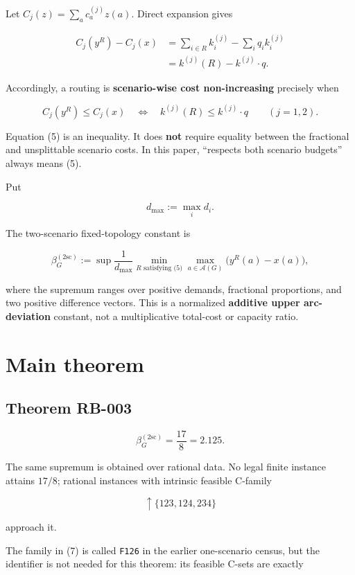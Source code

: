\documentclass[
  11pt,
]{article}
\begin{document}
Let \(C_j(z)=\sum_a c_a^{(j)}z(a)\). Direct expansion gives

\[
\begin{aligned}
C_j(y^R)-C_j(x)
&=\sum_{i\in R}k_i^{(j)}-\sum_iq_i k_i^{(j)}\\
&=k^{(j)}(R)-k^{(j)}\!\cdot q.
\end{aligned}
\tag{4}
\]

Accordingly, a routing is \textbf{scenario-wise cost non-increasing}
precisely when

\[
C_j(y^R)\le C_j(x)
\quad\Longleftrightarrow\quad
k^{(j)}(R)\le k^{(j)}\!\cdot q
\qquad(j=1,2).
\tag{5}
\]

Equation (5) is an inequality. It does \textbf{not} require equality
between the fractional and unsplittable scenario costs. In this paper,
``respects both scenario budgets'' always means (5).

Put

\[
d_{\max}:=\max_i d_i.
\]

The two-scenario fixed-topology constant is

\[
\beta_G^{(2\mathrm{sc})}
:=
\sup
\frac1{d_{\max}}
\min_{R\text{ satisfying (5)}}
\max_{a\in\mathcal A(G)}\bigl(y^R(a)-x(a)\bigr),
\tag{6}
\]

where the supremum ranges over positive demands, fractional proportions,
and two positive difference vectors. This is a normalized
\textbf{additive upper arc-deviation} constant, not a multiplicative
total-cost or capacity ratio.

\section{Main theorem}\label{main-theorem}

\subsection{Theorem RB-003}\label{theorem-rb-003}

\[
\boxed{\beta_G^{(2\mathrm{sc})}=\frac{17}{8}=2.125.}
\]

The same supremum is obtained over rational data. No legal finite
instance attains \(17/8\); rational instances with intrinsic feasible
C-family

\[
\uparrow\{123,124,234\}
\tag{7}
\]

approach it.

The family in (7) is called \texttt{F126} in the earlier one-scenario
census, but the identifier is not needed for this theorem: its feasible
C-sets are exactly
\end{document}

